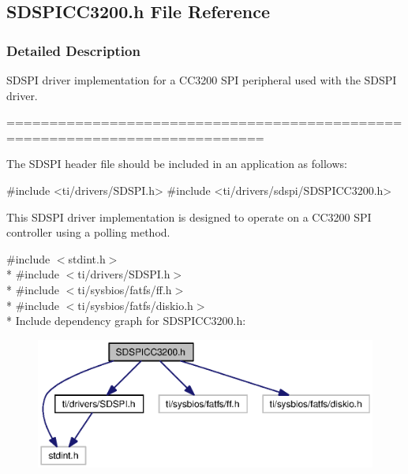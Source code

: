 \subsection{S\+D\+S\+P\+I\+C\+C3200.\+h File Reference}
\label{_s_d_s_p_i_c_c3200_8h}


\subsubsection{Detailed Description}
S\+D\+S\+P\+I driver implementation for a C\+C3200 S\+P\+I peripheral used with the S\+D\+S\+P\+I driver. 

============================================================================

The S\+D\+S\+P\+I header file should be included in an application as follows\+: 
\begin{DoxyCode}
\textcolor{preprocessor}{#include <ti/drivers/SDSPI.h>}
\textcolor{preprocessor}{#include <ti/drivers/sdspi/SDSPICC3200.h>}
\end{DoxyCode}


This S\+D\+S\+P\+I driver implementation is designed to operate on a C\+C3200 S\+P\+I controller using a polling method. 

{\ttfamily \#include $<$stdint.\+h$>$}\\*
{\ttfamily \#include $<$ti/drivers/\+S\+D\+S\+P\+I.\+h$>$}\\*
{\ttfamily \#include $<$ti/sysbios/fatfs/ff.\+h$>$}\\*
{\ttfamily \#include $<$ti/sysbios/fatfs/diskio.\+h$>$}\\*
Include dependency graph for S\+D\+S\+P\+I\+C\+C3200.\+h\+:
\nopagebreak
\begin{figure}[H]
\begin{center}
\leavevmode
\includegraphics[width=350pt]{_s_d_s_p_i_c_c3200_8h__incl}
\end{center}
\end{figure}
